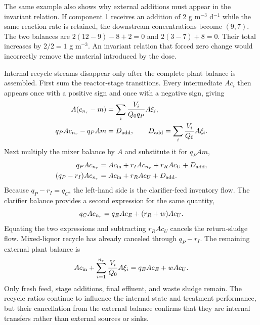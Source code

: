 The same example also shows why external additions must appear in the invariant relation. If component 1 receives an addition of 2 g m$^{-3}$ d$^{-1}$ while the same reaction rate is retained, the downstream concentrations become $(9,7)$. The two balances are $2(12-9)-8+2=0$ and $2(3-7)+8=0$. Their total increases by $2/2=1$ g m$^{-3}$. An invariant relation that forced zero change would incorrectly remove the material introduced by the dose.

Internal recycle streams disappear only after the complete plant balance is assembled. First sum the reactor-stage transitions. Every intermediate $Ac_i$ then appears once with a positive sign and once with a negative sign, giving
\begin{align}
\equationname{Accumulated invariant change across the reactor train}
A(c_{n_r}-m)&=\sum_i\frac{V_i}{Q_0q_P}A\xi_i,\\
\equationname{Reactor-train invariant equation and external-addition total}
q_PAc_{n_r}-q_PAm&=D_{\rm add},\qquad
D_{\rm add}=\sum_i\frac{V_i}{Q_0}A\xi_i.
\end{align}
Next multiply the mixer balance by $A$ and substitute it for $q_PAm$,
\begin{align}
\equationname{Reactor-train invariant equation after mixer substitution}
q_PAc_{n_r}&=Ac_{\rm in}+r_IAc_{n_r}+r_RAc_U+D_{\rm add},\\
\equationname{Invariant equation after cancellation of mixed-liquor recycle}
(q_P-r_I)Ac_{n_r}&=Ac_{\rm in}+r_RAc_U+D_{\rm add}.
\end{align}
Because $q_P-r_I=q_C$, the left-hand side is the clarifier-feed inventory flow. The clarifier balance provides a second expression for the same quantity,
\begin{equation}
\equationname{Clarifier-feed invariant flow equals the two outlet invariant flows}
q_CAc_{n_r}=q_EAc_E+(r_R+w)Ac_U.
\end{equation}
Equating the two expressions and subtracting $r_RAc_U$ cancels the return-sludge flow. Mixed-liquor recycle has already canceled through $q_P-r_I$. The remaining external plant balance is
\begin{equation}
\equationname{External plant mass conservation after internal recycle cancellation}
Ac_{\rm in}+\sum_{i=1}^{n_r}\frac{V_i}{Q_0}A\xi_i
=q_EAc_E+wAc_U.
\label{eq:plant_external_invariant}
\end{equation}
Only fresh feed, stage additions, final effluent, and waste sludge remain. The recycle ratios continue to influence the internal state and treatment performance, but their cancellation from the external balance confirms that they are internal transfers rather than external sources or sinks.

